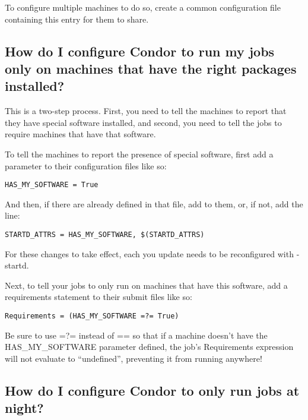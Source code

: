 To configure multiple machines to do so, create a common
configuration file containing this entry for them to share.

\subsection*{How do I configure Condor to run my jobs only on machines that have the right packages installed?}

This is a two-step process.
First, you need to tell the machines to report that they have special
software installed, and second, you need to tell the jobs to require
machines that have that software.

To tell the machines to report the presence of special software, first
add a parameter to their configuration files like so:

\begin{verbatim}
HAS_MY_SOFTWARE = True
\end{verbatim}

And then, if there are already  defined in that file, add
 to them, or, if not, add the line:

\footnotesize
\begin{verbatim}
STARTD_ATTRS = HAS_MY_SOFTWARE, $(STARTD_ATTRS)
\end{verbatim}
\normalsize

\Note For these changes to take effect, each  you update
needs to be reconfigured with  -startd.

Next, to tell your jobs to only run on machines that have this
software, add a requirements statement to their submit files like so:

\footnotesize
\begin{verbatim}
Requirements = (HAS_MY_SOFTWARE =?= True)
\end{verbatim}
\normalsize

\Note Be sure to use =?= instead of == so that if a machine doesn't have
the HAS\_MY\_SOFTWARE parameter defined, the job's Requirements
expression will not evaluate to ``undefined'', preventing it from
running anywhere!


\subsection*{How do I configure Condor to only run jobs at night?}

